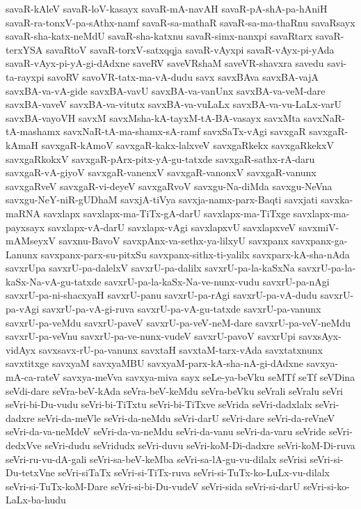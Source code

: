 {savaR-kAleV
savaR-loV-kasayx
savaR-mA-navAH
savaR-pA-shA-pa-hAniH
savaR-ra-tonxV-pa-sAthx-namf
savaR-sa-mathaR
savaR-sa-ma-thaRnu
savaRsayx
savaR-sha-katx-neMdU
savaR-sha-katxnu
savaR-simx-nanxpi
savaRtarx
savaR-terxYSA
savaRtoV
savaR-torxV-satxqqja
savaR-vAyxpi
savaR-vAyx-pi-yAda
savaR-vAyx-pi-yA-gi-dAdxne
saveRV
saveVRshaM
saveVR-shavxra
savedu
savi-ta-rayxpi
savoRV
savoVR-tatx-ma-vA-dudu
savx
savxBAva
savxBA-vajA
savxBA-va-vA-gide
savxBA-vavU
savxBA-va-vanUnx
savxBA-va-veM-dare
savxBA-vaveV
savxBA-va-vitutx
savxBA-va-vuLaLx
savxBA-va-vu-LaLx-varU
savxBA-vayoVH
savxM
savxMsha-kA-tayxM-tA-BA-vasayx
savxMta
savxNaR-tA-mashamx
savxNaR-tA-ma-shamx-sA-ramf
savxSaTx-vAgi
savxgaR
savxgaR-kAmaH
savxgaR-kAmoV
savxgaR-kakx-lalxveV
savxgaRkekx
savxgaRkekxV
savxgaRkokxV
savxgaR-pArx-pitx-yA-gu-tatxde
savxgaR-sathx-rA-daru
savxgaR-vA-giyoV
savxgaR-vanenxV
savxgaR-vanonxV
savxgaR-vanunx
savxgaRveV
savxgaR-vi-deyeV
savxgaRvoV
savxgu-Na-diMda
savxgu-NeVna
savxgu-NeY-niR-gUDhaM
savxjA-tiVya
savxja-namx-parx-Baqti
savxjati
savxka-maRNA
savxlapx
savxlapx-ma-TiTx-gA-darU
savxlapx-ma-TiTxge
savxlapx-ma-payxsayx
savxlapx-vA-darU
savxlapx-vAgi
savxlapxvU
savxlapxveV
savxmiV-mAMseyxV
savxnu-BavoV
savxpAnx-va-sethx-ya-lilxyU
savxpanx
savxpanx-ga-Lanunx
savxpanx-parx-su-pitxSu
savxpanx-sithx-ti-yalilx
savxparx-kA-sha-nAda
savxrUpa
savxrU-pa-dalelxV
savxrU-pa-dalilx
savxrU-pa-la-kaSxNa
savxrU-pa-la-kaSx-Na-vA-gu-tatxde
savxrU-pa-la-kaSx-Na-ve-nunx-vudu
savxrU-pa-nAgi
savxrU-pa-ni-shacxyaH
savxrU-panu
savxrU-pa-rAgi
savxrU-pa-vA-dudu
savxrU-pa-vAgi
savxrU-pa-vA-gi-ruva
savxrU-pa-vA-gu-tatxde
savxrU-pa-vanunx
savxrU-pa-veMdu
savxrU-paveV
savxrU-pa-veV-neM-dare
savxrU-pa-veV-neMdu
savxrU-pa-veVnu
savxrU-pa-ve-nunx-vudeV
savxrU-pavoV
savxrUpi
savxsAyx-vidAyx
savxsavx-rU-pa-vanunx
savxtaH
savxtaM-tarx-vAda
savxtatxnunx
savxtitxge
savxyaM
savxyaMBU
savxyaM-parx-kA-sha-nA-gi-dAdxne
savxya-mA-ca-rateV
savxya-meVva
savxya-miva
sayx
seLe-ya-beVku
seMTf
seTf
seVDina
seVdi-dare
seVra-beV-kAda
seVra-beV-keMdu
seVra-beVku
seVrali
seVralu
seVri
seVri-bi-Du-vudu
seVri-bi-TiTxtu
seVri-bi-TiTxve
seVrida
seVri-dadxlalx
seVri-dadxre
seVri-da-meVle
seVri-da-neMdu
seVri-darU
seVri-dare
seVri-da-reVneV
seVri-da-va-neMdeV
seVri-da-va-neMdu
seVri-da-vanu
seVri-da-varu
seVride
seVri-dedxVve
seVri-dudu
seVridudx
seVri-duvu
seVri-koM-Di-dadxre
seVri-koM-Di-ruva
seVri-ru-vu-dA-gali
seVri-sa-beV-keMba
seVri-sa-lA-gu-vu-dilalx
seVrisi
seVri-si-Du-tetxVne
seVri-siTaTx
seVri-si-TiTx-ruva
seVri-si-TuTx-ko-LuLx-vu-dilalx
seVri-si-TuTx-koM-Dare
seVri-si-bi-Du-vudeV
seVri-sida
seVri-si-darU
seVri-si-ko-LaLx-ba-hudu
}
